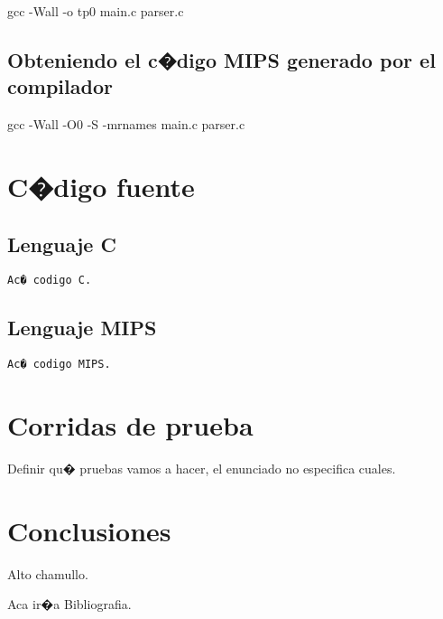 \documentclass[a4paper,10pt]{article}
\begin{document}
gcc -Wall -o tp0 main.c parser.c

\subsection{Obteniendo el c�digo MIPS generado por el compilador}

gcc -Wall -O0 -S -mrnames main.c parser.c

\section{C�digo fuente}

\subsection{Lenguaje C}

\begin{verbatim}
Ac� codigo C.
\end{verbatim}

\subsection{Lenguaje MIPS}

\begin{verbatim}
Ac� codigo MIPS.
\end{verbatim}

\section{Corridas de prueba}

Definir qu� pruebas vamos a hacer, el enunciado no especifica cuales.

\section{Conclusiones}

Alto chamullo.


\begin{thebibliography}{99}

Aca ir�a Bibliografia.

\end{thebibliography}
\end{document}
